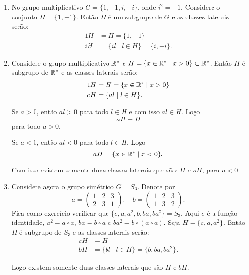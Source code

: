 \begin{exemplos}
    \begin{enumerate}[label={\arabic*})]
        \item No grupo multiplicativo $G = \{1, -1, i, -i\}$, onde $i^2 = -1$. Considere o conjunto $H = \{1, -1\}$. Então $H$ é um subgrupo de $G$ e as classes laterais serão:
        \begin{align*}
            1H &= H = \{1, -1\}\\
            iH &= \{il \mid l \in H\} = \{i, -i\}.
        \end{align*}

        \item Considere o grupo multiplicativo $\mathbb{R}^*$ e $H = \{ x \in \mathbb{R}^* \mid x > 0\} \subset \mathbb{R}^*$. Então $H$ é subgrupo de $\mathbb{R}^*$ e as classes laterais serão:
        \begin{align*}
            1H &= H = \{x \in \mathbb{R}^* \mid x > 0\}\\
            aH &= \{al \mid l \in H\}.
        \end{align*}

        Se $a > 0$, então $al > 0$ para todo $l \in H$ e com isso $al \in H$. Logo
        \[
            aH = H
        \]
        para todo $a > 0$.

        Se $a < 0$, então $al < 0$ para todo $l \in H$. Logo
        \[
            aH = \{x \in \mathbb{R}^* \mid x < 0\}.
        \]

        Com isso existem somente duas classes laterais que são: $H$ e $aH$, para $a < 0$.

        \item Considere agora o grupo simétrico $G = S_3$. Denote por
        \[
            a = \begin{pmatrix}
                    1 & 2 & 3\\2 & 3 & 1
                \end{pmatrix}, \quad
            b = \begin{pmatrix}
                    1 & 2 & 3\\1 & 3 & 2
                \end{pmatrix}.
        \]
        Fica como exercício verificar que $\{e, a, a^2 , b, ba, ba^2\} = S_3$. Aqui $e$ é a função identidade, $a^2 = a \circ a$, $ba = b \circ a$ e $ba^2 = b\circ(a\circ a)$. Seja $H = \{e, a , a^2\}$. Então $H$ é subgrupo de $S_3$ e as classes laterais serão:
        \begin{align*}
            eH &= H\\
            bH &= \{bl \mid l \in H\} = \{b, ba, ba^2\}.
        \end{align*}

        Logo existem somente duas classes laterais que são $H$ e $bH$.
    \end{enumerate}
\end{exemplos}

